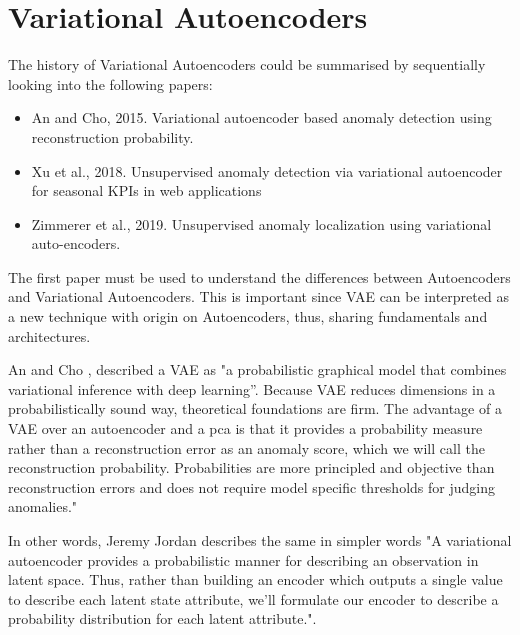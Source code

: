 \section{Variational Autoencoders}

The history of Variational Autoencoders could be summarised by sequentially looking into the following papers:

\begin{itemize}
    \item An and Cho, 2015. Variational autoencoder based anomaly detection using reconstruction probability. \cite{ancho}
    \item Xu et al., 2018. Unsupervised anomaly detection via variational autoencoder for seasonal KPIs in web applications \cite{xuetal}
    \item Zimmerer et al., 2019. Unsupervised anomaly localization using variational auto-encoders. \cite{zimmereretal}
\end{itemize}

The first paper must be used to understand the differences between Autoencoders and Variational Autoencoders. This is important since VAE can be interpreted as a new technique with origin on Autoencoders, thus, sharing fundamentals and architectures.

An and Cho \cite{ancho}, described a VAE as "a probabilistic graphical model that combines variational inference with deep learning”. Because VAE reduces dimensions in a probabilistically sound way, theoretical foundations are firm. The advantage of a VAE over an autoencoder and a \acrshort{pca} is that it provides a probability measure rather than a reconstruction error as an anomaly score, which we will call the reconstruction probability. Probabilities are more principled and objective than reconstruction errors and does not require model specific thresholds for judging anomalies."

In other words, Jeremy Jordan \cite{jjordan} describes the same in simpler words "A variational autoencoder provides a probabilistic manner for describing an observation in latent space. Thus, rather than building an encoder which outputs a single value to describe each latent state attribute, we'll formulate our encoder to describe a probability distribution for each latent attribute.".

